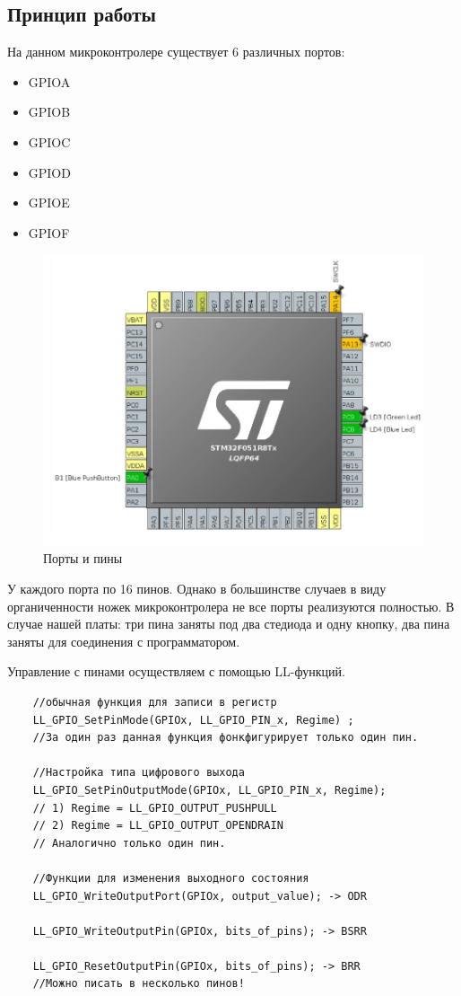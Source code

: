 \subsection{Принцип работы}

На данном микроконтролере существует 6 различных портов:
\begin{itemize}
    \item GPIOA
    \item GPIOB
    \item GPIOC
    \item GPIOD
    \item GPIOE
    \item GPIOF
\end{itemize}   


\begin{figure}[h!]
		\centering
		\includegraphics[width=1\linewidth]{pics/scheme.png}
		\caption{Порты и пины}
		\label{drebezg}
\end{figure}

У каждого порта по 16 пинов. Однако в большинстве случаев в виду органиченности ножек микроконтролера не все порты реализуются полностью. В случае нашей платы: три пина заняты под два стедиода и одну кнопку, два пина заняты для соединения с программатором. 


Управление с пинами осуществляем с помощью LL-функций.

\begin{verbatim}
    //обычная функция для записи в регистр
    LL_GPIO_SetPinMode(GPIOx, LL_GPIO_PIN_x, Regime) ;
    //За один раз данная функция фонкфигурирует только один пин.

    //Настройка типа цифрового выхода
    LL_GPIO_SetPinOutputMode(GPIOx, LL_GPIO_PIN_x, Regime);
    // 1) Regime = LL_GPIO_OUTPUT_PUSHPULL
    // 2) Regime = LL_GPIO_OUTPUT_OPENDRAIN
    // Аналогично только один пин.
    
    //Функции для изменения выходного состояния
    LL_GPIO_WriteOutputPort(GPIOx, output_value); -> ODR
    
    LL_GPIO_WriteOutputPin(GPIOx, bits_of_pins); -> BSRR
    
    LL_GPIO_ResetOutputPin(GPIOx, bits_of_pins); -> BRR
    //Можно писать в несколько пинов!

\end{verbatim}


